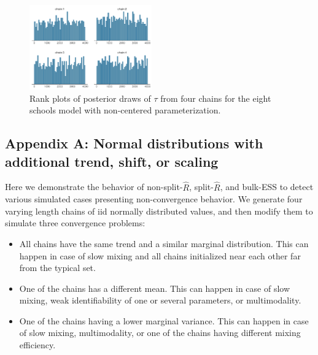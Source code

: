 \documentclass[american,]{article}
\providecommand{\tightlist}{%
  \setlength{\itemsep}{0pt}\setlength{\parskip}{0pt}}
\theoremstyle{definition}
\begin{document}
\begin{figure}[tp]
  \centering
  \includegraphics[width=0.47\textwidth]{graphics/hist-fit-ncp2-1.pdf}
  \caption{Rank plots of posterior draws of $\tau$ from four chains for 
  the eight schools model with non-centered parameterization.}
  \label{fig:hist-fit-ncp2-1}
\end{figure}


\hypertarget{refs}{}



\newpage

\hypertarget{AppendixD}{%
\subsection*{Appendix A: Normal distributions with additional trend,
shift, or scaling}\label{AppendixA}}

Here we demonstrate the behavior of non-split-\(\widehat{R}\),
split-\(\widehat{R}\), and bulk-ESS to detect various simulated cases
presenting non-convergence behavior. We generate four varying length
chains of iid normally distributed values, and then modify them to
simulate three convergence problems:
\begin{itemize}
\tightlist
\item All chains have the same trend and a similar marginal
  distribution. This can happen in case of slow mixing and all chains
  initialized near each other far from the typical set.
\item One of the chains has a different mean. This can happen in case
  of slow mixing, weak identifiability of one or several parameters, or
  multimodality.
\item One of the chains having a lower marginal variance. This can
  happen in case of slow mixing, multimodality, or one of the chains
  having different mixing efficiency.
\end{itemize}
\end{document}
